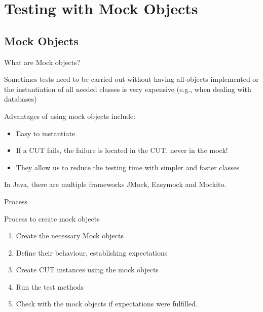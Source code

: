 \documentclass[11pt, xcolor=svgnames]{beamer}
\begin{document}


\section{Testing with Mock Objects}


\subsection{Mock Objects}


\begin{frame}{What are Mock objects?}


Sometimes tests need to be carried out without having all objects implemented or the instantiation of all needed classes is very expensive (e.g., when dealing with databases)

Advantages of using mock objects include:

\begin{itemize}
 \item Easy to instantiate
 \item If a CUT fails, the failure is located in the CUT, never in the mock!
 \item They allow us to reduce the testing time with simpler and faster classes
\end{itemize}

In Java, there are multiple frameworks JMock, Easymock and Mockito.

\end{frame}


\begin{frame}{Process}

Process to create mock objects

\begin{enumerate}
 \item Create the necessary Mock objects
 \item Define their behaviour, establishing expectations
 \item Create CUT instances using the mock objects
 \item Run the test methods 
 \item Check with the mock objects if expectations were fulfilled. 
\end{enumerate}

\end{frame}
\end{document}
